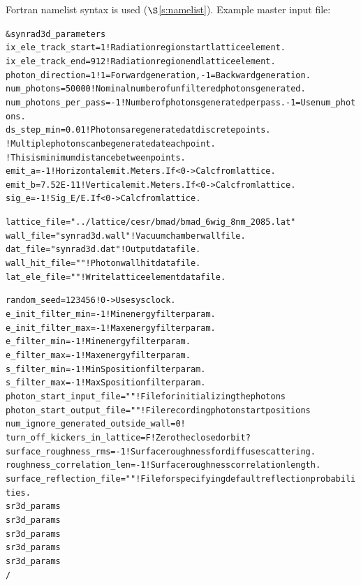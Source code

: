 \documentclass[11pt,openany]{report}
\newcommand{\sref}[1]{$\S$\ref{#1}}
\newlength{\ExBeg}
\newlength{\ExEnd}
\newenvironment{example}
  {\vspace{\ExBeg} \begin{alltt}}
  {\end{alltt} \vspace{\ExEnd}}
\begin{document}
Fortran namelist syntax is used (\sref{s:namelist}). Example master input file:
\begin{example}
  &synrad3d_parameters
    ix_ele_track_start   = 1      ! Radiation region start lattice element.
    ix_ele_track_end     = 912    ! Radiation region end lattice element.
    photon_direction     = 1      ! 1 = Forward generation, -1 = Backward generation.
    num_photons          = 50000  ! Nominal number of unfiltered photons generated. 
    num_photons_per_pass = -1     ! Number of photons generated per pass. -1 = Use num_photons.
    ds_step_min          = 0.01   ! Photons are generated at discrete points. 
                              ! Multiple photons can be generated at each point.
                              ! This is minimum distance between points.
    emit_a       = -1         ! Horizontal emit. Meters. If < 0 -> Calc from lattice.
    emit_b       = 7.52E-11   ! Vertical emit.  Meters. If < 0 -> Calc from lattice.
    sig_e        = -1         ! Sig_E/E. If < 0 -> Calc from lattice.

    lattice_file = "../lattice/cesr/bmad/bmad_6wig_8nm_2085.lat" 
    wall_file    = "synrad3d.wall"   ! Vacuum chamber wall file.
    dat_file     = "synrad3d.dat"    ! Output data file.
    wall_hit_file = ""               ! Photon wall hit data file.
    lat_ele_file  = ""               ! Write lattice element data file.

    random_seed = 123456             ! 0 -> Use sys clock.
    e_init_filter_min = -1           ! Min energy filter param.
    e_init_filter_max = -1           ! Max energy filter param.
    e_filter_min = -1                ! Min energy filter param.
    e_filter_max = -1                ! Max energy filter param.
    s_filter_min = -1                ! Min S position filter param.
    s_filter_max = -1                ! Max S position filter param.
    photon_start_input_file  = ""    ! File for initializing the photons
    photon_start_output_file = ""    ! File recording photon start positions
    num_ignore_generated_outside_wall = 0    !
    turn_off_kickers_in_lattice = F          ! Zero the closed orbit?
    surface_roughness_rms       = -1         ! Surface roughness for diffuse scattering.
    roughness_correlation_len   = -1         ! Surface roughness correlation length.
    surface_reflection_file     = ""         ! File for specifying default reflection probabilities.
    sr3d_params%
    sr3d_params%
    sr3d_params%
    sr3d_params%
    sr3d_params%
  /
\end{example}
\end{document}
